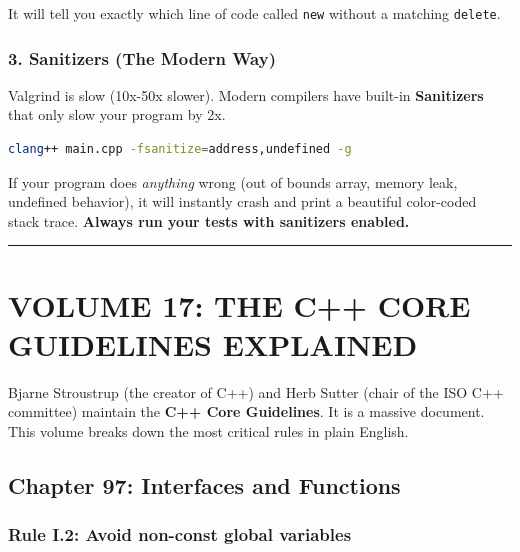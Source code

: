 It will tell you exactly which line of code called
\passthrough{\lstinline!new!} without a matching
\passthrough{\lstinline!delete!}.

\hypertarget{sanitizers-the-modern-way}{%
\subsubsection{3. Sanitizers (The Modern
Way)}\label{sanitizers-the-modern-way}}

Valgrind is slow (10x-50x slower). Modern compilers have built-in
\textbf{Sanitizers} that only slow your program by 2x.

\begin{lstlisting}[language=bash]
clang++ main.cpp -fsanitize=address,undefined -g
\end{lstlisting}

If your program does \emph{anything} wrong (out of bounds array, memory
leak, undefined behavior), it will instantly crash and print a beautiful
color-coded stack trace. \textbf{Always run your tests with sanitizers
enabled.}

\begin{center}\rule{0.5\linewidth}{0.5pt}\end{center}

\hypertarget{volume-17-the-c-core-guidelines-explained}{%
\section{VOLUME 17: THE C++ CORE GUIDELINES
EXPLAINED}\label{volume-17-the-c-core-guidelines-explained}}

Bjarne Stroustrup (the creator of C++) and Herb Sutter (chair of the ISO
C++ committee) maintain the \textbf{C++ Core Guidelines}. It is a
massive document. This volume breaks down the most critical rules in
plain English.

\hypertarget{chapter-97-interfaces-and-functions}{%
\subsection{Chapter 97: Interfaces and
Functions}\label{chapter-97-interfaces-and-functions}}

\hypertarget{rule-i.2-avoid-non-const-global-variables}{%
\subsubsection{Rule I.2: Avoid non-const global
variables}\label{rule-i.2-avoid-non-const-global-variables}}

